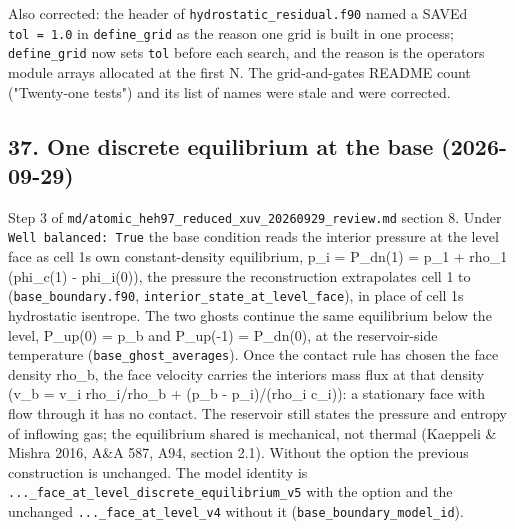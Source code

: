 \documentclass[english,a4paper]{my_memo}
\begin{document}
Also corrected: the header of \texttt{hydrostatic\_residual.f90} named a SAVEd
\texttt{tol\ =\ 1.0} in \texttt{define\_grid} as the reason one grid is built in one process;
\texttt{define\_grid} now sets \texttt{tol} before each search, and the reason is the
operator\textquotesingle s module arrays allocated at the first N. The grid-and-gates README
count ("Twenty-one tests") and its list of names were stale and were
corrected.

\subsection{37. One discrete equilibrium at the base (2026-09-29)}\label{37-one-discrete-equilibrium-at-the-base-2026-09-29}

Step 3 of \texttt{md/atomic\_heh97\_reduced\_xuv\_20260929\_review.md} section 8. Under
\texttt{Well\ balanced:\ True} the base condition reads the interior pressure at the
level face as cell 1\textquotesingle s own constant-density equilibrium,
p\_i = P\_dn(1) = p\_1 + rho\_1 (phi\_c(1) - phi\_i(0)), the pressure the
reconstruction extrapolates cell 1 to (\texttt{base\_boundary.f90},
\texttt{interior\_state\_at\_level\_face}), in place of cell 1\textquotesingle s hydrostatic isentrope.
The two ghosts continue the same equilibrium below the level,
P\_up(0) = p\_b and P\_up(-1) = P\_dn(0), at the reservoir-side temperature
(\texttt{base\_ghost\_averages}). Once the contact rule has chosen the face density
rho\_b, the face velocity carries the interior\textquotesingle s mass flux at that density
(v\_b = v\_i rho\_i/rho\_b + (p\_b - p\_i)/(rho\_i c\_i)): a stationary face with
flow through it has no contact. The reservoir still states the pressure and
entropy of inflowing gas; the equilibrium shared is mechanical, not thermal
(Kaeppeli \& Mishra 2016, A\&A 587, A94, section 2.1). Without the option the
previous construction is unchanged. The model identity is
\texttt{...\_face\_at\_level\_discrete\_equilibrium\_v5} with the option and the
unchanged \texttt{...\_face\_at\_level\_v4} without it (\texttt{base\_boundary\_model\_id}).
\end{document}
